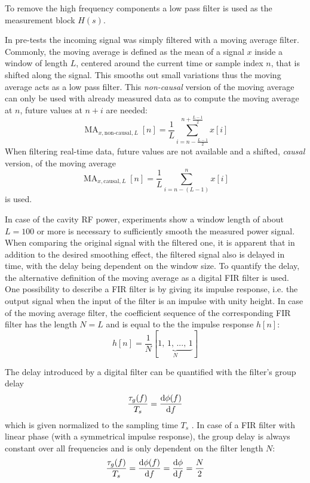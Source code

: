 To remove the high frequency components a low pass filter is used as the measurement block $H(s)$.

In pre-tests the incoming signal was simply filtered with a moving average filter.
Commonly, the moving average is defined as the mean of a signal $x$ inside a window of length $L$, centered around the current time or sample index $n$, that is shifted along the signal. This smooths out small variations thus the moving average acts as a low pass filter.
This \textit{non-causal} version of the moving average can only be used with already measured data as to compute the moving average at $n$, future values at $n+i$ are needed:
\begin{equation}
\operatorname{MA}_{x,\text{non-causal},L}[n] = \frac{1}{L} \sum_{i=n-\frac{L-1}{2}}^{n+\frac{L-1}{2}} x[i]
\end{equation}
When filtering real-time data, future values are not available and a shifted, \textit{causal} version, of the moving average
\begin{equation}\label{eq:causalMA}
\operatorname{MA}_{x,\text{causal},L}[n] = \frac{1}{L} \sum_{i=n-(L-1)}^{n} x[i]
\end{equation}
is used.

In case of the cavity RF power, experiments show a window length of about $L=100$ or more is necessary to sufficiently smooth the measured power signal.
When comparing the original signal with the filtered one, it is apparent that in addition to the desired smoothing effect, the filtered signal also is delayed in time, with the delay being dependent on the window size.
To quantify the delay, the alternative definition of the moving average as a digital FIR filter is used.
One possibility to describe a FIR filter is by giving its impulse response, i.e. the output signal when the input of the filter is an impulse with unity height. In case of the moving average filter, the coefficient sequence of the corresponding FIR filter has the length $N=L$ and is equal to the the impulse response $h[n]$:
\begin{equation}
h[n] = \frac{1}{N} [\underbrace{1,\,1,\,...,\,1}_N]
\end{equation}

The delay introduced by a digital filter can be quantified with the filter's group delay
\begin{equation}
\frac{\tau_g(f)}{T_s} = \frac{\text{d}{\phi(f)}}{\text{d}{f}}
\end{equation}
which is given normalized to the sampling time $T_s$ \cite[p.~70]{Kammeyer2002}. In case of a FIR filter with linear phase (with a symmetrical impulse response), the group delay is always constant over all frequencies and is only dependent on the filter length $N$\cite[p.~165]{Kammeyer2002}:
\begin{equation}\label{eq:groupD}
\frac{\tau_g(f)}{T_s} = \frac{\text{d}{\phi(f)}}{\text{d}{f}} = \frac{\text{d}{\phi}}{\text{d}{f}} = \frac{N}{2}
\end{equation}

